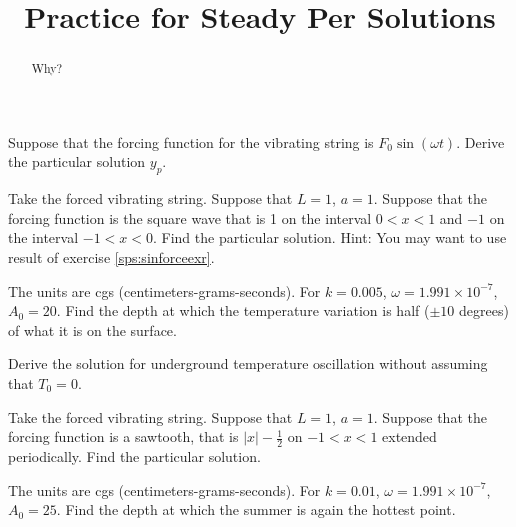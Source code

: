 \documentclass{ximera}
\title{Practice for Steady Per Solutions}
\begin{document}
\begin{abstract}
Why?
\end{abstract}
\maketitle


\begin{exercise} \label{sps:sinforceexr}
    Suppose that the forcing function for the vibrating string is $F_0 \sin (\omega t)$.  Derive the particular solution $y_p$.
\end{exercise}

\begin{exercise}
    Take the forced vibrating string. Suppose that $L=1$, $a=1$.  Suppose that the forcing function is the square wave that is 1 on the interval $0 < x < 1$ and $-1$ on the interval $-1 < x< 0$. Find the particular solution.  Hint: You may want to use result of exercise \ref{sps:sinforceexr}.
\end{exercise}

\begin{exercise}
    The units are cgs (centimeters-grams-seconds). For $k=0.005$, $\omega = 1.991 \times {10}^{-7}$, $A_0 = 20$. Find the depth at which the temperature variation is half ($\pm 10$ degrees) of what it is on the surface.
\end{exercise}

\begin{exercise}
    Derive the solution for underground temperature oscillation without assuming that $T_0 = 0$.
\end{exercise}


\begin{exercise}
    Take the forced vibrating string. Suppose that $L=1$, $a=1$.  Suppose that the forcing function is a sawtooth, that is $\lvert x \rvert -\frac{1}{2}$ on $-1 < x < 1$ extended periodically. Find the particular solution.
\end{exercise}

\begin{exercise}
    The units are cgs (centimeters-grams-seconds). For $k=0.01$, $\omega = 1.991 \times {10}^{-7}$, $A_0 = 25$. Find the depth at which the summer is again the hottest point.
\end{exercise}
\end{document}
